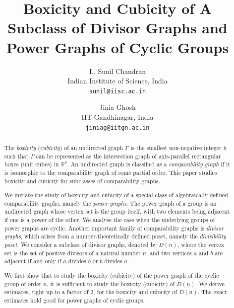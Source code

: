 \documentclass[twoside, 11pt]{article}
\title{Boxicity and Cubicity of A Subclass of Divisor Graphs and Power Graphs of Cyclic Groups}
\date{}
\author{
L. Sunil Chandran \\
 Indian Institute of Science, India \\
    \texttt{sunil@iisc.ac.in} \\
  \and
    Jinia Ghosh \\
  IIT Gandhinagar, India \\
  \texttt{jiniag@iitgn.ac.in} \\  
}
\begin{document}
\maketitle




\begin{abstract}
The \textit{boxicity} (\textit{cubicity}) of an undirected graph $\Gamma$ is the smallest non-negative integer $k$ such that $\Gamma$ can be represented as the intersection graph of axis-parallel rectangular boxes (unit cubes) in $\mathbb{R}^k$. An undirected graph is classified as a \textit{comparability graph} if it is isomorphic to the comparability graph of some partial order. This paper studies boxicity and cubicity for subclasses of comparability graphs.

 
We initiate the study of boxicity and cubicity of a special class of algebraically defined comparability graphs, namely the \textit{power graphs}. The power graph of a group is an undirected graph whose vertex set is the group itself, with two elements being adjacent if one is a power of the other. We analyse the case when the underlying groups of power graphs are cyclic. Another important family of comparability graphs is \textit{divisor graphs}, which arises from a number-theoretically defined poset, namely the \textit{divisibility poset}. We consider a subclass of divisor graphs, denoted by $D(n)$, where the vertex set is the set of positive divisors of a natural number $n$, and two vertices $a$ and $b$ are adjacent if and only if $a$ divides $b$ or $b$ divides $a$. 


We first show that to study the boxicity (cubicity) of the power graph of the cyclic group of order $n$, it is sufficient to study the boxicity (cubicity) of $D(n)$. We derive estimates, tight up to a factor of $2$, for the boxicity and cubicity of $D(n)$. The exact estimates hold good for power graphs of cyclic groups.
\end{abstract}
\end{document}
